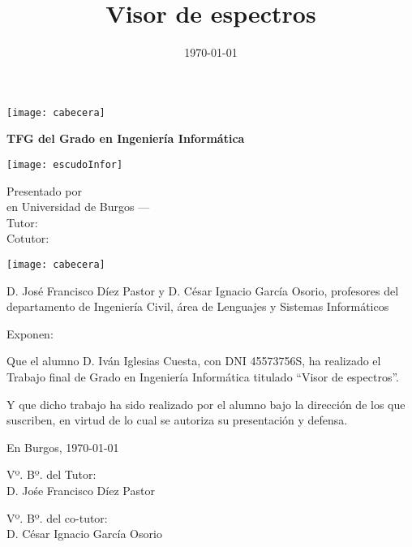 \documentclass[a4paper,12pt,twoside]{memoir}
\title{Visor de espectros}
\author{\nombre}
\date{\today}
\makeatletter
\def\maketitle{
	\null
	\thispagestyle{empty}
	\noindent\texttt{[image: cabecera]}\vspace{1cm}%
	\vfill
	\colorbox{cpardoBox}{%
		\begin{minipage}{.8\textwidth}
			\vspace{.5cm}\Large
			\begin{center}
				\textbf{TFG del Grado en Ingeniería Informática}\vspace{.6cm}\\
				\textbf{\LARGE\@title{}}
			\end{center}
			\vspace{.2cm}
		\end{minipage}
		
	}%
	\hfill\begin{minipage}{.20\textwidth}
		\texttt{[image: escudoInfor]}
	\end{minipage}
	\vfill
	\begin{center}%
		{%
			\noindent\LARGE
			Presentado por \@author{}\\ 
			en Universidad de Burgos --- \@date{}\\
			Tutor: \@tutor{}\\
			Cotutor: \@cotutor{}\\
		}%
	\end{center}%
	\null
	\cleardoublepage
}
\newcommand{\nombre}{Iván Iglesias Cuesta} %
\makeatother
\begin{document}
	
	\maketitle
	
	
	\newpage\null\thispagestyle{empty}\newpage
	
	
	
	\thispagestyle{empty}
	
	
	\noindent\texttt{[image: cabecera]}\vspace{1cm}
	
	\noindent D. José Francisco Díez Pastor y D. César Ignacio García Osorio, profesores del
	departamento de Ingeniería Civil, área de Lenguajes y Sistemas Informáticos
	
	\noindent Exponen:
	
	\noindent Que el alumno D. \nombre, con DNI 45573756S, ha realizado el Trabajo final
	de Grado en Ingeniería Informática titulado ``Visor de espectros''. 
	
	\noindent Y que dicho trabajo ha sido realizado por el alumno bajo la dirección
	de los que suscriben, en virtud de lo cual se autoriza su presentación y defensa.
	
	\begin{center} %
		En Burgos, {\large \today}
	\end{center}
	
	\vfill\vfill\vfill
	
	\begin{minipage}{0.45\textwidth}
		\begin{flushleft} %
			Vº. Bº. del Tutor:\\[2cm]
			D. Jośe Francisco Díez Pastor
		\end{flushleft}
	\end{minipage}
	\hfill
	\begin{minipage}{0.45\textwidth}
		\begin{flushleft} %
			Vº. Bº. del co-tutor:\\[2cm]
			D. César Ignacio García Osorio
		\end{flushleft}
	\end{minipage}
	\hfill
	
	\vfill
	
	
\end{document}
